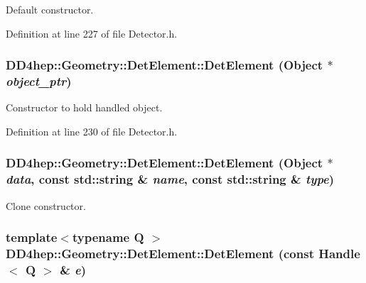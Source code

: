 Default constructor. 

Definition at line 227 of file Detector.h.\hypertarget{class_d_d4hep_1_1_geometry_1_1_det_element_a8f0fb6554c6b1589e6e44d879735e269}{
\subsubsection[{DetElement}]{\setlength{\rightskip}{0pt plus 5cm}DD4hep::Geometry::DetElement::DetElement ({\bf Object} $\ast$ {\em object\_\-ptr})}}
\label{class_d_d4hep_1_1_geometry_1_1_det_element_a8f0fb6554c6b1589e6e44d879735e269}


Constructor to hold handled object. 

Definition at line 230 of file Detector.h.\hypertarget{class_d_d4hep_1_1_geometry_1_1_det_element_ac7ddea123648d4b336e63c7e0ae7106c}{
\subsubsection[{DetElement}]{\setlength{\rightskip}{0pt plus 5cm}DD4hep::Geometry::DetElement::DetElement ({\bf Object} $\ast$ {\em data}, \/  const std::string \& {\em name}, \/  const std::string \& {\em type})}}
\label{class_d_d4hep_1_1_geometry_1_1_det_element_ac7ddea123648d4b336e63c7e0ae7106c}


Clone constructor. \hypertarget{class_d_d4hep_1_1_geometry_1_1_det_element_a1083c73c02ad2cf66857c01ccaee507d}{
\subsubsection[{DetElement}]{\setlength{\rightskip}{0pt plus 5cm}template$<$typename Q $>$ DD4hep::Geometry::DetElement::DetElement (const {\bf Handle}$<$ Q $>$ \& {\em e})}}
\label{class_d_d4hep_1_1_geometry_1_1_det_element_a1083c73c02ad2cf66857c01ccaee507d}


